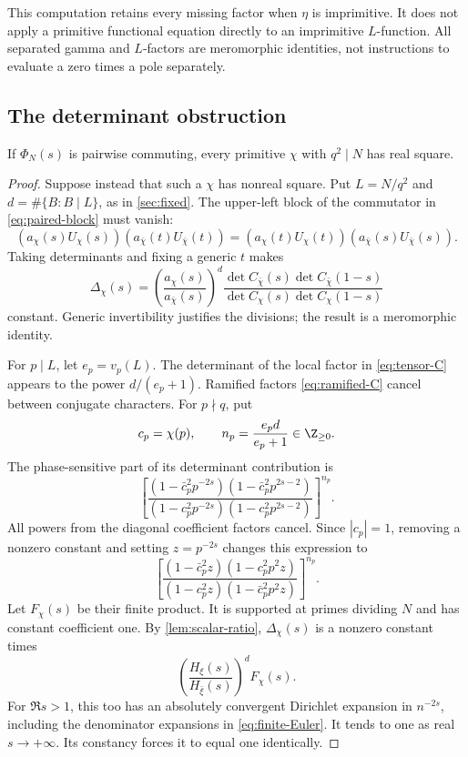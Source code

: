 This computation retains every missing factor when \(\eta\) is
imprimitive. It does not apply a primitive functional equation
directly to an imprimitive \(L\)-function. All separated gamma and
\(L\)-factors are meromorphic identities, not instructions to
evaluate a zero times a pole separately.

\subsection{The determinant obstruction}

\begin{proposition}\label{prop:nonreal-obstruction}
If \(\Phi_N(s)\) is pairwise commuting, every primitive \(\chi\)
with \(q^2\mid N\) has real square.
\end{proposition}
\begin{proof}
Suppose instead that such a \(\chi\) has nonreal square. Put
\(L=N/q^2\) and \(d=\#\{B:B\mid L\}\), as in
\cref{sec:fixed}. The upper-left block of the commutator in
\eqref{eq:paired-block} must vanish:
\[
 (a_\chi(s)U_\chi(s))(a_{\bar\chi}(t)U_{\bar\chi}(t))
 =
 (a_\chi(t)U_\chi(t))(a_{\bar\chi}(s)U_{\bar\chi}(s)).
\]
Taking determinants and fixing a generic \(t\) makes
\begin{equation}\label{eq:Delta}
 \Delta_\chi(s)=
 \left(\frac{a_\chi(s)}{a_{\bar\chi}(s)}\right)^d
 \frac{\det C_{\bar\chi}(s)\det C_{\bar\chi}(1-s)}
      {\det C_\chi(s)\det C_\chi(1-s)}
\end{equation}
constant. Generic invertibility justifies the divisions; the
result is a meromorphic identity.

For \(p\mid L\), let \(e_p=v_p(L)\). The determinant of the
local factor in \eqref{eq:tensor-C} appears to the power
\(d/(e_p+1)\). Ramified factors \eqref{eq:ramified-C} cancel
between conjugate characters. For \(p\nmid q\), put
\[
 c_p=\chi(p),\qquad n_p=\frac{e_pd}{e_p+1}\in\Z_{\ge0}.
\]
The phase-sensitive part of its determinant contribution is
\[
 \left[
 \frac{(1-\bar c_p^2p^{-2s})(1-\bar c_p^2p^{2s-2})}
      {(1-c_p^2p^{-2s})(1-c_p^2p^{2s-2})}
 \right]^{n_p}.
\]
All powers from the diagonal coefficient factors cancel. Since
\(|c_p|=1\), removing a nonzero constant and setting \(z=p^{-2s}\)
changes this expression to
\begin{equation}\label{eq:finite-Euler}
 \left[
 \frac{(1-\bar c_p^2z)(1-c_p^2p^2z)}
      {(1-c_p^2z)(1-\bar c_p^2p^2z)}
 \right]^{n_p}.
\end{equation}
Let \(F_\chi(s)\) be their finite product. It is supported at primes
dividing \(N\) and has constant coefficient one.
By \cref{lem:scalar-ratio}, \(\Delta_\chi(s)\) is a nonzero
constant times
\begin{equation}\label{eq:normalized-Delta}
 \left(\frac{H_\xi(s)}{H_{\bar\xi}(s)}\right)^d F_\chi(s).
\end{equation}
For \(\Re s>1\), this too has an absolutely convergent Dirichlet
expansion in \(n^{-2s}\), including the denominator expansions
in \eqref{eq:finite-Euler}. It tends to one as real \(s\to+\infty\).
Its constancy forces it to equal one identically.


\end{proof}
